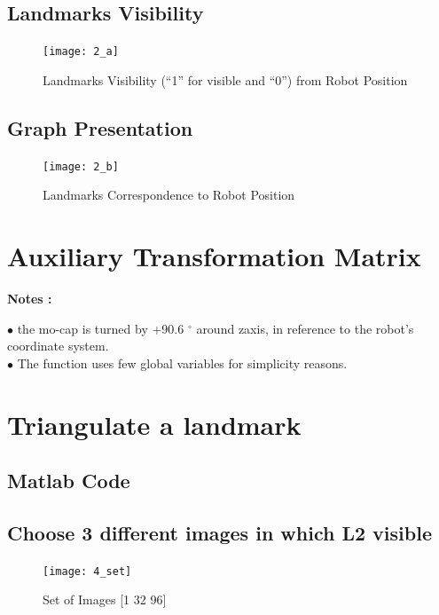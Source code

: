 \documentclass[a4paper]{article}
\begin{document}
\subsection{Landmarks Visibility}

\begin{figure}[H]
\centering
\texttt{[image: 2\_a]}
\caption{Landmarks Visibility (“1” for visible and “0”) from Robot Position} 
\end{figure}

\subsection{Graph Presentation}



\begin{figure}[H]
\centering
\texttt{[image: 2\_b]}
\caption{ Landmarks Correspondence to Robot Position } 
\end{figure}
\newpage

\section{Auxiliary Transformation Matrix}


\textbf{Notes : }\begin{flushleft}
$\bullet$ the mo-cap is turned by +90.6 $^{\circ}$ around zaxis, in reference to the
robot’s coordinate system. \\

$\bullet$ The function uses few global variables for simplicity reasons. \end{flushleft}
\newpage 

\section{Triangulate a landmark}
\subsection*{Matlab Code}



\subsection{Choose 3 different images in which L2 visible}
\begin{figure}[H]
\centering
\texttt{[image: 4\_set]}
\caption{ Set of Images [1 32 96] } 
\end{figure}
\end{document}
